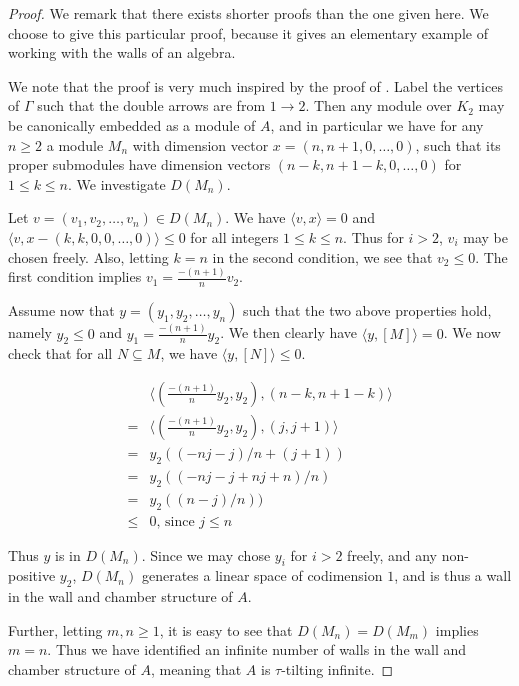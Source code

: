 \documentclass[]{article}
\theoremstyle{definition}
\newcommand{\tu}{\ensuremath{\tau}}
\begin{document}
\begin{proof}
	We remark that there exists shorter proofs than the one given here. We choose to give this particular proof, because it gives an elementary example of working with the walls of an algebra.
	
	We note that the proof is very much inspired by the proof of \cite[Theorem 4.14]{Br_stle_2019}. Label the vertices of $\Gamma$ such that the double arrows are from $1 \to 2$. Then any module over $K_2$ may be canonically embedded as a module of $A$, and in particular we have for any $n \geq 2$ a module $M_n$ with dimension vector $x = (n,n+1,0,\dots,0)$, such that its proper submodules have dimension vectors $(n-k,n+1-k,0,\dots,0)$ for $1 \leq k \leq n$. We investigate $D(M_n)$.
	
	Let $v = (v_1,v_2,\dots,v_n) \in D(M_n)$. We have $\langle v,x \rangle = 0$ and $\langle v,x - (k,k,0,0,\dots,0)\rangle \leq 0$ for all integers $1 \leq k \leq n$. Thus for $i > 2$, $v_i$ may be chosen freely. Also, letting $k = n$ in the second condition, we see that $v_2 \leq 0$. The first condition implies $v_1 = \frac{-(n+1)}{n}v_2$.
	
	Assume now that $y = (y_1,y_2,\dots,y_n)$ such that the two above properties hold, namely $y_2 \leq 0$ and $y_1 = \frac{-(n+1)}{n}y_2$. We then clearly have $\langle y,[M]\rangle = 0$. We now check that for all $N \subseteq M$, we have $\langle y,[N]\rangle \leq 0$. 
	
	\begin{align}
	&\langle (\frac{-(n+1)}{n}y_2,y_2), (n-k,n+1-k)\rangle \\
	=&\langle (\frac{-(n+1)}{n}y_2,y_2), (j,j+1)\rangle \\
	=& y_2((-nj-j)/n + (j+1)) \\
	=& y_2((-nj - j + nj + n)/n) \\
	=& y_2((n-j)/n)) \\
	\leq& 0\text{, since } j \leq n
	\end{align}
	
	Thus $y$ is in $D(M_n)$. Since we may chose $y_i$ for $i > 2$ freely, and any non-positive $y_2$, $D(M_n)$ generates a linear space of codimension $1$, and is thus a wall in the wall and chamber structure of $A$.
	
	Further, letting $m,n \geq 1$, it is easy to see that $D(M_n) = D(M_m)$ implies $m = n$. Thus we have identified an infinite number of walls in the wall and chamber structure of $A$, meaning that $A$ is \tu-tilting infinite.
	
\end{proof}
\end{document}
